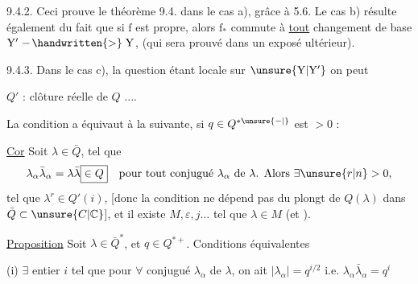 9.4.2. Ceci prouve le théorème 9.4. dans le cas a), grâce à 5.6.
Le cas b) résulte également du fait que si $\mathrm{f}$ est propre, alors $\mathrm{f_*}$
commute à \uline{tout} changement de base $\mathrm{Y' \mathrel{\relbar\joinrel\handwritten{>}} Y}$, (qui sera prouvé dans un
exposé ultérieur).

9.4.3. Dans le cas c), la question étant locale sur $\mathrm{\unsure{Y|Y'}}$ on peut

$Q'$ : clôture  réelle de $Q$ ....

La condition a équivaut à la suivante, si $q\in Q^{* \unsure{-|{}}}$ est $>0$ :

\uline{Cor} Soit $\lambda\in\bar Q$, tel que 
\[
\lambda_\alpha\bar\lambda_\alpha=\lambda\bar\lambda\boxed{\in Q}
\quad\text{pour tout conjugué $\lambda_\alpha$ de $\lambda$. Alors $\exists\unsure{r|n}>0$,}
\]
\quad {}
tel que $\lambda^{r}\in Q'(i)$, [donc la condition ne dépend pas du
plongt de $Q(\lambda)$ dans $\bar Q\subset\unsure{C|\mathbb C}$], et 
il existe $M,\varepsilon,j\ldots$  tel que $\lambda\in M$ (et ).

\uline{Proposition} Soit $\lambda\in\bar Q^*$, et $q\in Q^{*+}$. Conditions équivalentes

(i) $\exists$ entier $i$ tel que pour $\forall$ conjugué $\lambda_\alpha$ de $\lambda$, on ait $|\lambda_\alpha|=q^{i/2}$
i.e. $\lambda_\alpha\bar\lambda_\alpha=q^i$

